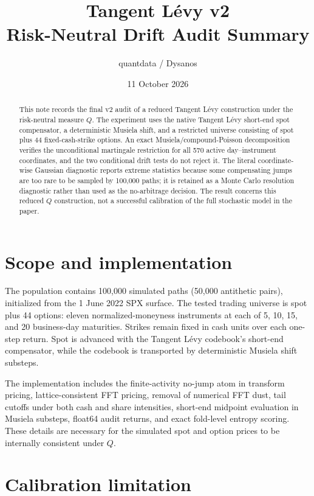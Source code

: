 \documentclass[11pt]{article}
\title{Tangent L\'evy v2\\Risk-Neutral Drift Audit Summary}
\author{quantdata / Dysanos}
\date{11 October 2026}
\begin{document}
\maketitle

\begin{abstract}
This note records the final v2 audit of a reduced Tangent L\'evy construction under
the risk-neutral measure $Q$.  The experiment uses the native Tangent L\'evy
short-end spot compensator, a deterministic Musiela shift, and a restricted
universe consisting of spot plus 44 fixed-cash-strike options.  An exact
Musiela/compound-Poisson decomposition verifies the unconditional martingale
restriction for all 570 active day--instrument coordinates, and the two
conditional drift tests do not reject it.  The literal coordinate-wise
Gaussian diagnostic reports extreme statistics because some compensating jumps
are too rare to be sampled by 100,000 paths; it is retained as a Monte Carlo
resolution diagnostic rather than used as the no-arbitrage decision.  The
result concerns this reduced $Q$ construction, not a successful calibration of
the full stochastic model in the paper.
\end{abstract}

\section{Scope and implementation}

The population contains 100,000 simulated paths (50,000 antithetic pairs),
initialized from the 1 June 2022 SPX surface.  The tested trading universe is
spot plus 44 options: eleven normalized-moneyness instruments at each of 5, 10,
15, and 20 business-day maturities.  Strikes remain fixed in cash units over
each one-step return.  Spot is advanced with the Tangent L\'evy codebook's
short-end compensator, while the codebook is transported by deterministic
Musiela shift substeps.

The implementation includes the finite-activity no-jump atom in transform
pricing, lattice-consistent FFT pricing, removal of numerical FFT dust, tail
cutoffs under both cash and share intensities, short-end midpoint evaluation in
Musiela substeps, float64 audit returns, and exact fold-level entropy scoring.
These details are necessary for the simulated spot and option prices to be
internally consistent under $Q$.

\section{Calibration limitation}
\end{document}
